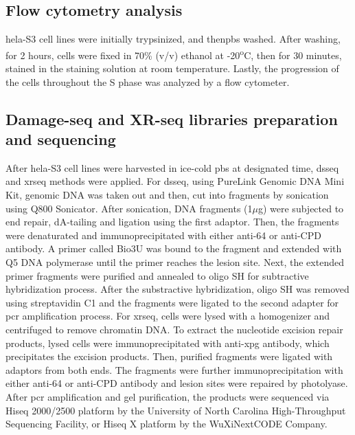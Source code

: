 \subsection{Flow cytometry analysis}
\gls{hela}-S3 cell lines were initially trypsinized, and then\gls{pbs} washed. After washing, for 2 hours, cells were fixed in 70\% (v/v) ethanol at -20\textsuperscript{o}C, then for 30 minutes, stained in the staining solution at room temperature. Lastly, the progression of the cells throughout the S phase was analyzed by a flow cytometer.

\subsection{Damage-seq and  XR-seq libraries preparation and sequencing}
After \gls{hela}-S3 cell lines were harvested in ice-cold \gls{pbs} at designated time, \gls{dsseq} and \gls{xrseq} methods were applied. For \gls{dsseq}, using PureLink Genomic DNA Mini Kit, genomic DNA was taken out and then, cut into fragments by sonication using Q800 Sonicator. After sonication, DNA fragments (1$\mu$g) were subjected to end repair, dA-tailing and ligation using the first adaptor. Then, the fragments were denaturated and immunoprecipitated with either anti-\gls{64} or anti-\gls{CPD} antibody. A primer called Bio3U was bound to the fragment and extended with Q5 DNA polymerase until the primer reaches the lesion site. Next, the extended primer fragments were purified and annealed to oligo SH for subtractive hybridization process. After the substractive hybridization, oligo SH was removed using streptavidin C1 and the fragments were ligated to the second adapter for \gls{pcr} amplification process. For \gls{xrseq}, cells were lysed with a homogenizer and centrifuged to remove chromatin DNA. To extract the nucleotide excision repair products, lysed cells were immunoprecipitated with anti-\gls{xpg} antibody, which precipitates the excision products. Then, purified fragments were ligated with adaptors from both ends. The fragments were further immunoprecipitation with either anti-\gls{64} or anti-\gls{CPD} antibody and lesion sites were repaired by photolyase. After \gls{pcr} amplification and gel purification, the products were sequenced via Hiseq 2000/2500 platform by the University of North Carolina High-Throughput Sequencing Facility, or Hiseq X platform by the WuXiNextCODE Company.  

